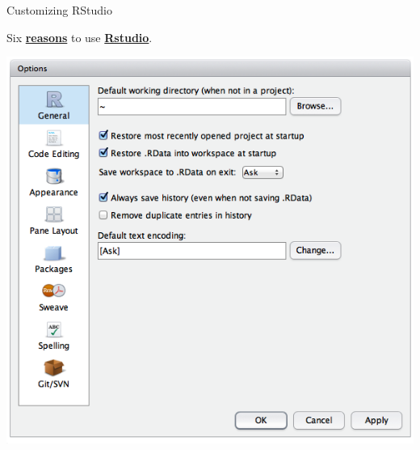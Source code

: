 \documentclass[ignorenonframetext,]{beamer}
\begin{document}
\begin{frame}{Customizing RStudio}
\protect\hypertarget{customizing-rstudio}{}

\begin{block}{Six
\href{http://www.r-bloggers.com/top-6-reasons-you-need-to-be-using-rstudio/}{\textbf{reasons}}
to use
\href{https://support.rstudio.com/hc/en-us/articles/200549016-Customizing-RStudio}{\textbf{Rstudio}}.}

\includegraphics{figure/options_general.png}

\end{block}

\end{frame}
\end{document}
